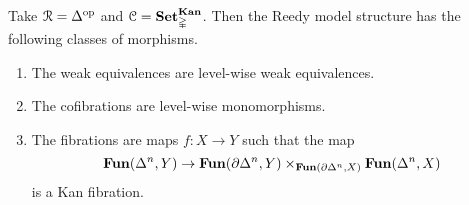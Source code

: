 \documentclass[main.tex]{subfiles}
\begin{document}
\begin{example}
  Take $\mathcal{R} = \Delta^{\mathrm{op}}$ and $\mathcal{C} = \mathbf{Set}_{\mathbb{\Delta}}^{\mathbf{Kan}}$. Then the Reedy model structure has the following classes of morphisms.
  \begin{enumerate}
    \item The weak equivalences are level-wise weak equivalences.

    \item The cofibrations are level-wise monomorphisms.

    \item The fibrations are maps $f\colon X \to Y$ such that the map
      \begin{equation*}
        \mathbf{Fun}(\Delta^{n}, Y) \to \mathbf{Fun}(\partial\Delta^{n}, Y) \times_{\mathbf{Fun}(\partial \Delta^{n}, X)} \mathbf{Fun}(\Delta^{n}, X)
      \end{equation*}
      is a Kan fibration.
  \end{enumerate}
\end{example}
\end{document}
